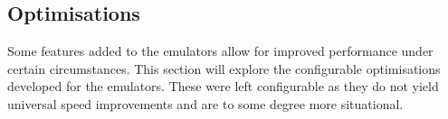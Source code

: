 \subsection{Optimisations}
\label{section:optimisations}

Some features added to the emulators allow for improved performance under certain circumstances. This section will explore the configurable optimisations developed for the emulators. These were left configurable as they do not yield universal speed improvements and are to some degree more situational.


